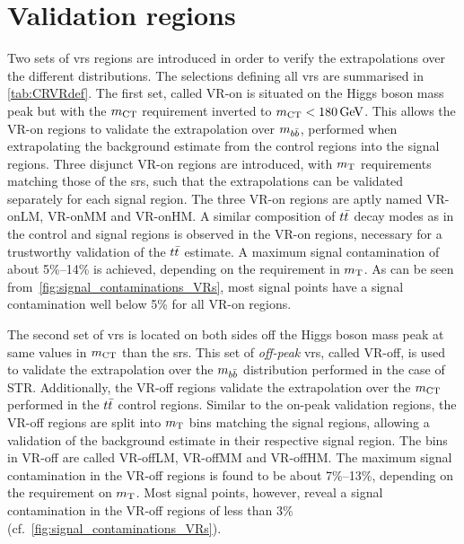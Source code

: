 \section{Validation regions}


Two sets of \glspl{vr} regions are introduced in order to verify the extrapolations over the different distributions. The selections defining all \glspl{vr} are summarised in \cref{tab:CRVRdef}. The first set, called VR-on is situated on the Higgs boson mass peak but with the $m_{\textrm{CT}}$ requirement inverted to $\mct<\SI{180}{\GeV}$. This allows the VR-on regions to validate the extrapolation over $m_{b\bar{b}}$, performed when extrapolating the background estimate from the control regions into the signal regions. Three disjunct VR-on regions are introduced, with $m_{\textrm{T}}$ requirements matching those of the \glspl{sr}, such that the extrapolations can be validated separately for each signal region. The three VR-on regions are aptly named VR-onLM, VR-onMM and VR-onHM. A similar composition of $t\bar{t}$ decay modes as in the control and signal regions is observed in the VR-on regions, necessary for a trustworthy validation of the $t\bar{t}$ estimate. A maximum signal contamination of about 5\%--14\% is achieved, depending on the requirement in $m_{\textrm{T}}$. As can be seen from~\cref{fig:signal_contaminations_VRs}, most signal points have a signal contamination well below 5\% for all VR-on regions.  

 The second set of \glspl{vr} is located on both sides off the Higgs boson mass peak at same values in $m_{\textrm{CT}}$ than the \glspl{sr}. This set of \textit{off-peak} \glspl{vr}, called VR-off, is used to validate the extrapolation over the $m_{b\bar{b}}$ distribution performed in the case of STR. Additionally, the VR-off regions validate the extrapolation over the $m_{\textrm{CT}}$ performed in the $t\bar{t}$ control regions. Similar to the on-peak validation regions, the VR-off regions are split into $m_{\textrm{T}}$ bins matching the signal regions, allowing a validation of the background estimate in their respective signal region. The bins in VR-off are called VR-offLM, VR-offMM and VR-offHM. The maximum signal contamination in the VR-off regions is found to be about 7\%--13\%, depending on the requirement on $m_{\textrm{T}}$. Most signal points, however, reveal a signal contamination in the VR-off regions of less than 3\% (cf.~\cref{fig:signal_contaminations_VRs}).


